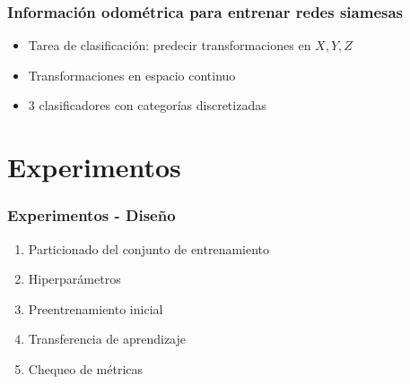 \documentclass{beamer}
\begin{document}
\begin{frame}
\frametitle{Información odométrica para entrenar redes siamesas}
\begin{itemize}
    \item Tarea de clasificación: predecir transformaciones en \(X, Y, Z\)
    \item Transformaciones en espacio continuo 
    \item 3 clasificadores con categorías discretizadas
\end{itemize}
\end{frame}





\section{Experimentos}
\begin{frame}
\frametitle{Experimentos - Diseño}
\begin{enumerate}
    \item Particionado del conjunto de entrenamiento
    \item Hiperparámetros
    \item Preentrenamiento inicial
    \item Transferencia de aprendizaje
    \item Chequeo de métricas
\end{enumerate}
\end{frame}
\end{document}
